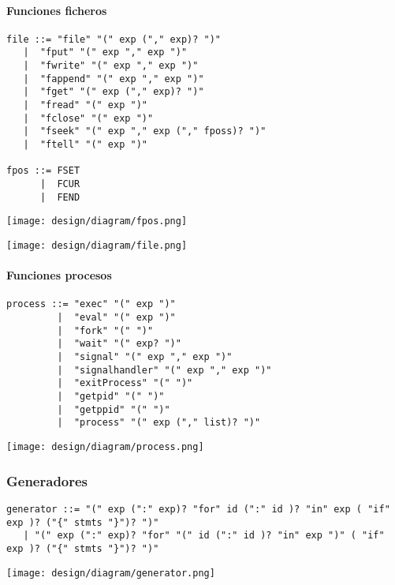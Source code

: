\paragraph{Funciones ficheros}
\begin{multicols}{2}
\begin{lstlisting}[style=nonumbers, basicstyle=\tiny]      
file ::= "file" "(" exp ("," exp)? ")"
   |  "fput" "(" exp "," exp ")"
   |  "fwrite" "(" exp "," exp ")"
   |  "fappend" "(" exp "," exp ")"
   |  "fget" "(" exp ("," exp)? ")"
   |  "fread" "(" exp ")"
   |  "fclose" "(" exp ")"
   |  "fseek" "(" exp "," exp ("," fposs)? ")"
   |  "ftell" "(" exp ")"

fpos ::= FSET
      |  FCUR
      |  FEND
\end{lstlisting}  
\begin{center}
\texttt{[image: design/diagram/fpos.png]} 
\end{center}
\columnbreak	
\begin{center}
\texttt{[image: design/diagram/file.png]} 
\end{center}
\end{multicols}
\pagebreak

\paragraph{Funciones procesos}
\begin{multicols}{2}
\begin{lstlisting}[style=nonumbers, basicstyle=\tiny]      
process ::= "exec" "(" exp ")"
         |  "eval" "(" exp ")"
         |  "fork" "(" ")"
         |  "wait" "(" exp? ")"
         |  "signal" "(" exp "," exp ")"
         |  "signalhandler" "(" exp "," exp ")"
         |  "exitProcess" "(" ")"
         |  "getpid" "(" ")"
         |  "getppid" "(" ")"
         |  "process" "(" exp ("," list)? ")"
\end{lstlisting}  
\columnbreak	
\begin{center}
\texttt{[image: design/diagram/process.png]} 
\end{center}
\end{multicols}

\subsubsection{Generadores}
\begin{lstlisting}[style=nonumbers, basicstyle=\tiny]      
generator ::= "(" exp (":" exp)? "for" id (":" id )? "in" exp ( "if" exp )? ("{" stmts "}")? ")"
   | "(" exp (":" exp)? "for" "(" id (":" id )? "in" exp ")" ( "if" exp )? ("{" stmts "}")? ")"
\end{lstlisting}  
\begin{center}
\texttt{[image: design/diagram/generator.png]} 
\end{center}
